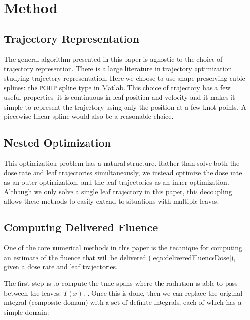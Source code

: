 \section{Method}

\subsection{Trajectory Representation}

The general algorithm presented in this paper is agnostic to the choice of trajectory represention.
There is a large literature in trajectory optimization studying trajectory representation. 
Here we choose to use shape-preserving cubic splines: the \texttt{PCHIP} spline type in Matlab.
This choice of trajectory has a few useful properties: it is continuous in leaf position and velocity
and it makes it simple to represent the trajectory using only the position at a few knot points.
A piecewise linear spline would also be a reasonable choice.


\subsection{Nested Optimization}

This optimization problem has a natural structure. Rather than solve both the dose rate and leaf trajectories simultaneously,
we instead optimize the dose rate as an outer optimization, and the leaf trajectories as an inner optimization.
Although we only solve a single leaf trajectory in this paper, this decoupling allows these methods to easily extend to situations with multiple leaves.


\subsection{Computing Delivered Fluence}

One of the core numerical methods in this paper is the technique for computing an estimate of the fluence
that will be delivered (\ref{eqn:deliveredFluenceDose}), given a dose rate and leaf trajectories.

The first step is to compute the time spans where the radiation is able to pass between the leaves: $T(x)$.
.
Once this is done, then we can replace the original integral (composite domain) with a set of definite integrals,
each of which has a simple domain:

